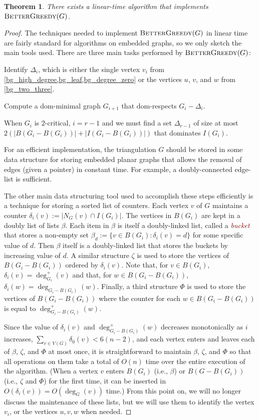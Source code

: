\documentclass[11pt]{article}
\newtheorem{thm}{Theorem}
\newcommand{\defin}[1]{\emph{\textcolor{Maroon}{#1}}}
\theoremstyle{definition}
\begin{document}
\begin{thm}
    There exists a linear-time algorithm that implements $\textsc{BetterGreedy}(G)$.
\end{thm}

\begin{proof}
    The techniques needed to implement $\textsc{BetterGreedy}(G)$ in linear time are fairly standard for algorithms on embedded graphs, so we only sketch the main tools used.  There are three main tasks performed by $\textsc{BetterGreedy}(G)$:
    \begin{compactenum}
        \item Identify $\Delta_i$, which is either the single vertex $v_i$ from \cref{bg_high_degree,bg_leaf,bg_degree_zero} or the vertices $u$, $v$, and $w$ from \cref{bg_two_three}.
        \item Compute a dom-minimal graph $G_{i+1}$ that dom-respects $G_i-\Delta_i$.
        \item When $G_i$ is $2$-critical, $i=r-1$ and we must find a set $\Delta_{r-1}$ of size at most $2(|B(G_i-B(G_i))| + |I(G_i-B(G_i))|)$ that dominates $I(G_i)$.
    \end{compactenum}

    For an efficient implementation, the triangulation $G$ should be stored in some data structure for storing embedded planar graphs that allows the removal of edges (given a pointer) in constant time. For example, a doubly-connected edge-list \cite{muller.preparata:finding} is sufficient.

    The other main data structuring tool used to accomplish these steps efficiently is a technique for storing a sorted list of counters.  Each vertex $v$ of $G$ maintains a counter $\delta_i(v):=|N_G(v)\cap I(G_i)|$.  The vertices in $B(G_i)$ are kept in a doubly list of lists $\beta$.  Each item in $\beta$ is itself a doubly-linked list, called a \defin{bucket} that stores a non-empty set $\beta_d:=\{v\in B(G_i):\delta_i(v)=d\}$ for some specific value of $d$. Then $\beta$ itself is a doubly-linked list that stores the buckets by increasing value of $d$.  A similar structure $\zeta$ is used to store the vertices of $B(G_i-B(G_i))$ ordered by $\delta_i(v)$.  Note that, for $v\in B(G_i)$, $\delta_i(v)=\deg^+_{G_i}(v)$ and that, for $w\in B(G_i-B(G_i))$, $\delta_i(w)=\deg_{G_i-B(G_i)}(w)$.  Finally, a third structure $\Phi$ is used to store the vertices of $B(G_i-B(G_i))$ where the counter for each $w\in B(G_i-B(G_i))$ is equal to $\deg^+_{G_i-B(G_i)}(w)$.

    Since the value of $\delta_i(v)$ and $\deg^+_{G_i-B(G_i)}(w)$ decreases monotonically as $i$ increases, $\sum_{v\in V(G)}\delta_0(v)<6(n-2)$, and each vertex enters and leaves each of $\beta$, $\zeta$, and $\Phi$ at most once, it is straightforward to maintain $\beta$, $\zeta$, and $\Phi$ so that all operations on them take a total of $O(n)$ time over the entire execution of the algorithm. (When a vertex $v$ enters $B(G_i)$ (i.e., $\beta$) or $B(G-B(G_i))$ (i.e., $\zeta$ and $\Phi$) for the first time, it can be inserted in $O(\delta_i(v))=O(\deg_G(v))$ time.) From this point on, we will no longer discuss the maintenance of these lists, but we will use them to identify the vertex $v_i$, or the vertices $u,v,w$ when needed.


\end{proof}
\end{document}
